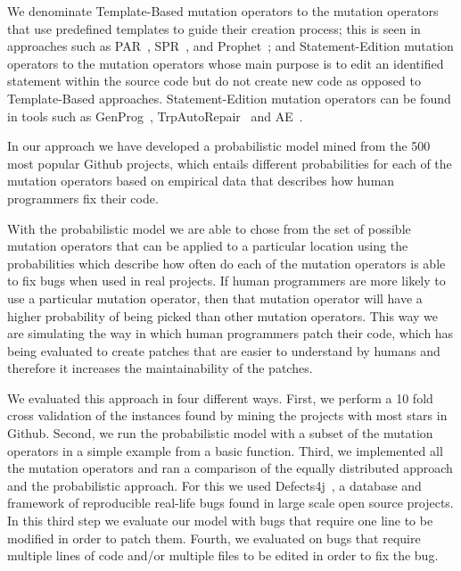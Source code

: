 \documentclass[conference]{IEEEtran}
\newcommand{\todo}[1]
  {{\scriptsize \textbf{\color{red} {#1}}}}
\begin{document}
We denominate Template-Based mutation operators to the mutation operators that 
use predefined templates to guide their creation process; this is seen in 
approaches such 
as PAR~\cite{kim2013}, SPR~\cite{fan15}, and Prophet~\cite{long15}; and 
Statement-Edition mutation operators to the mutation operators whose main purpose is to edit an identified statement within the source code but do not create new code as opposed to 
Template-Based approaches. Statement-Edition mutation operators can be found in 
tools such as GenProg~\cite{legoues12}, TrpAutoRepair~\cite{QiYuhua13} and 
AE~\cite{Weimer13}.

In our approach we have developed a probabilistic model mined 
from the 500 most popular Github projects, which 
entails different probabilities for each of the mutation operators based on 
empirical data that describes how human programmers fix their code.

With the probabilistic model we are able to chose from the set of possible
mutation operators that can be applied to a particular location using the
probabilities which describe how often do each of the mutation operators is able
to fix bugs when used in real projects. If human programmers are more likely to
use a particular mutation operator, then that mutation operator will have a
higher probability of being picked than other mutation operators. This way we 
are simulating the way in which human programmers patch their code, which has 
being evaluated to create patches that are easier to understand by humans and 
therefore it increases the maintainability of the patches. 

We evaluated this approach in four different ways. First, we perform a 10 fold cross validation of the instances found by mining the projects with most stars in Github. Second, we run the probabilistic model with a subset of the mutation operators in a simple example from a basic function. Third, we implemented all the mutation operators and ran a comparison of the equally distributed approach and the probabilistic approach. For this we used Defects4j~\cite{just14}, a database and framework of reproducible real-life bugs found in large scale open source projects. In this third step we evaluate our model with bugs that require one line to be modified in order to patch them. Fourth, we evaluated on bugs that require multiple lines of code and/or multiple files to be edited in order to fix the bug.
\end{document}
